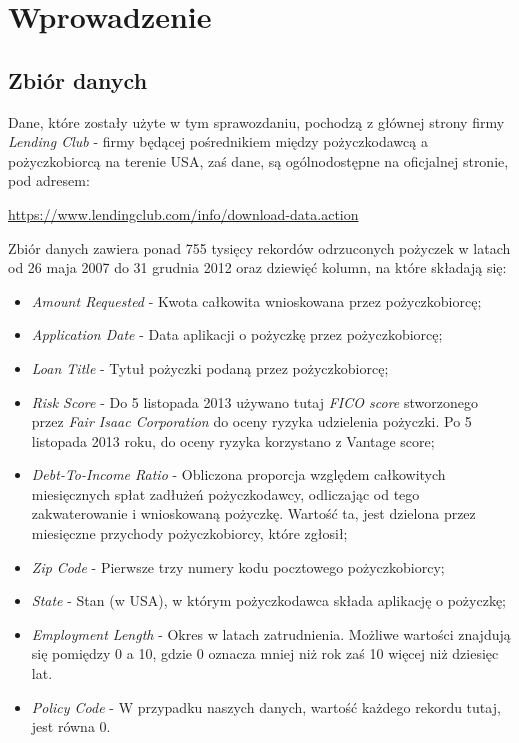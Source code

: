 \documentclass[11pt]{article}
\begin{document}
\newpage

\tableofcontents

\newpage

\section{Wprowadzenie}

\subsection{Zbiór danych}
Dane, które zostały użyte w tym sprawozdaniu, pochodzą z głównej strony firmy \textit{Lending Club} - firmy będącej pośrednikiem między pożyczkodawcą a pożyczkobiorcą na terenie USA, zaś dane, są ogólnodostępne na oficjalnej stronie, pod adresem:
\begin{center}
\url{https://www.lendingclub.com/info/download-data.action}
\end{center}

Zbiór danych zawiera ponad 755 tysięcy rekordów odrzuconych pożyczek w latach od 26 maja 2007 do 31 grudnia 2012 oraz dziewięć kolumn, na które składają się:
\begin{itemize}
\item \textit{Amount Requested} - Kwota całkowita wnioskowana przez pożyczkobiorcę;
\item \textit{Application Date} - Data aplikacji o pożyczkę przez pożyczkobiorcę;
\item \textit{Loan Title} - Tytuł pożyczki podaną przez pożyczkobiorcę;
\item \textit{Risk Score} - Do 5 listopada 2013 używano tutaj \textit{FICO score} stworzonego przez \textit{Fair Isaac Corporation} do oceny ryzyka udzielenia pożyczki. Po 5 listopada 2013 roku, do oceny ryzyka korzystano z Vantage score;
\item \textit{Debt-To-Income Ratio} - Obliczona proporcja względem całkowitych miesięcznych spłat zadłużeń pożyczkodawcy, odliczając od tego zakwaterowanie i wnioskowaną pożyczkę. Wartość ta, jest dzielona przez miesięczne przychody pożyczkobiorcy, które zgłosił;
\item \textit{Zip Code} - Pierwsze trzy numery kodu pocztowego pożyczkobiorcy;
\item \textit{State} - Stan (w USA), w którym pożyczkodawca składa aplikację o pożyczkę;
\item \textit{Employment Length} - Okres w latach zatrudnienia. Możliwe wartości znajdują się pomiędzy 0 a 10, gdzie 0 oznacza mniej niż rok zaś 10 więcej niż dziesięc lat.
\item \textit{Policy Code} - W przypadku naszych danych, wartość każdego rekordu tutaj, jest równa 0.
\end{itemize}
\end{document}
